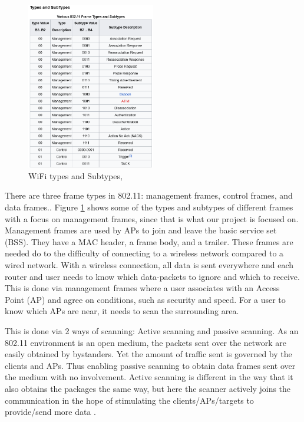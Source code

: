 \begin{figure}[!htbp]
    \centering
    \includegraphics[width=0.5\textwidth]{Latex-Files/Billeder/WiFi_Types.png}
    \caption{WiFi types and Subtypes, \cite{frame_types}}
    \label{WiFi Types}
\end{figure}

There are three frame types in 802.11: management frames, control frames, and data frames.\cite{Amit802.11frames, DefinitiveGast}. Figure \ref{WiFi Types} shows some of the types and subtypes of different frames with a focus on management frames, since that is what our project is focused on.  Management frames are used by APs to join and leave the basic service set (BSS). They have a MAC header, a frame body, and a trailer. These frames are needed do to the difficulty of connecting to a wireless network compared to a wired network. With a wireless connection, all data is sent everywhere and each router and user needs to know which data-packets to ignore and which to receive. This is done via management frames where a user associates with an Access Point (AP) and agree on conditions, such as security and speed. For a user to know which APs are near, it needs to scan the surrounding area. 

This is done via 2 ways of scanning: Active scanning and passive scanning. 
As an 802.11 environment is an open medium, the packets sent over the network are easily obtained by bystanders. Yet the amount of traffic sent is governed by the clients and APs. Thus enabling passive scanning to obtain data frames sent over the medium with no involvement. Active scanning is different in the way that it also obtains the packages the same way, but here the scanner actively joins the communication in the hope of stimulating the clients/APs/targets to provide/send more data \cite{Mitre2}.

